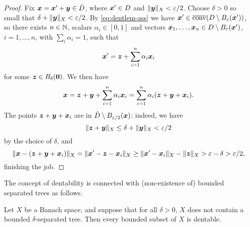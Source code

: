 \begin{proof}
  Fix $\bm{x} = \bm{x}' + \bm{y} \in \tilde{D}$, where $\bm{x}' \in D$ and $\|\bm{y}\|_{X} < \varepsilon/2$.
  Choose $\delta > 0$ so small that $\delta + \|\bm{y}\|_{X} < \varepsilon/2$.
  By \eqref{eq:dentlem-ass} we have $\bm{x}' \in \overline{\mathrm{conv}}(D \setminus B_{\varepsilon}(\bm{x}'))$, so there exists $n \in \mathbb{N}$, scalars $\alpha_i \in [0,1]$ and vectors $\bm{x}_1,\ldots,\bm{x}_n \in D \setminus B_{\varepsilon}(\bm{x}')$, $i = 1,\ldots,n$, with $\sum_{i} \alpha_{i} = 1$, such that
  \begin{equation*}
    \bm{x}' = \bm{z} + \sum_{i=1}^{n} \alpha_i \bm{x}_{i}
  \end{equation*}
  for some $\bm{z} \in B_{\delta}(\bm{0})$.
  We then have
  \begin{equation*}
    \bm{x} = \bm{z} + \bm{y} + \sum_{i=1}^{n} \alpha_i \bm{x}_{i} = \sum_{i=1}^{n}\alpha_i(\bm{z} + \bm{y} + \bm{x}_{i}).
  \end{equation*}
  The points $\bm{z} + \bm{y} + \bm{x}_{i}$ are in $\tilde{D} \setminus B_{\varepsilon/2}(\bm{x})$: indeed, we have
  \begin{equation*}
    \|\bm{z} + \bm{y}\|_{X} \leq \delta + \|\bm{y}\|_{X} < \varepsilon/2
  \end{equation*}
  by the choice of $\delta$, and
  \begin{equation*}
    \|\bm{x} - (\bm{z} + \bm{y} + \bm{x}_i) \|_{X}
    = \|\bm{x}' - \bm{z} - \bm{x}_i\|_{X}
    \geq \|\bm{x}' - \bm{x}_i\|_{X} - \|\bm{z}\|_{X}
    > \varepsilon - \delta > \varepsilon/2,
  \end{equation*}
  finishing the job.
\end{proof}

The concept of dentability is connected with (non-existence of) bounded separated trees as follows.

\begin{thm}
  Let $X$ be a Banach space, and suppose that for all $\delta > 0$, $X$ does not contain a bounded $\delta$-separated tree.
  Then every bounded subset of $X$ is dentable.
\end{thm}
  
